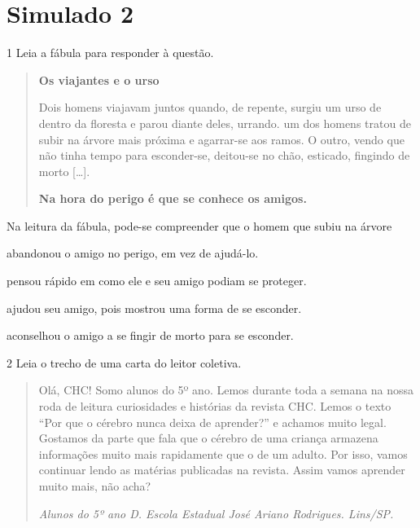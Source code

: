 \chapter{Simulado 2}

\num{1} Leia a fábula para responder à questão.

\begin{quote}
\textbf{Os viajantes e o urso}

Dois homens viajavam juntos quando, de repente, surgiu um urso de dentro
da floresta e parou diante deles, urrando. um dos homens tratou de subir
na árvore mais próxima e agarrar-se aos ramos. O outro, vendo que não
tinha tempo para esconder-se, deitou-se no chão, esticado, fingindo de
morto {[}\ldots{}{]}.

\textbf{Na hora do perigo é que se conhece os amigos.}
\end{quote}


Na leitura da fábula, pode-se compreender que o homem que subiu na árvore

\begin{escolha}
\item abandonou o amigo no perigo, em vez de ajudá-lo.

\item pensou rápido em como ele e seu amigo podiam se proteger.

\item ajudou seu amigo, pois mostrou uma forma de se esconder.

\item aconselhou o amigo a se fingir de morto para se esconder.
\end{escolha}



\num{2} Leia o trecho de uma carta do leitor coletiva.

\begin{quote}
Olá, CHC! Somo alunos do 5º ano. Lemos durante toda a semana na nossa
roda de leitura curiosidades e histórias da revista CHC. Lemos o texto
``Por que o cérebro nunca deixa de aprender?'' e achamos muito legal.
Gostamos da parte que fala que o cérebro de uma criança armazena
informações muito mais rapidamente que o de um adulto. Por isso, vamos
continuar lendo as matérias publicadas na revista. Assim vamos aprender
muito mais, não acha?

\begin{flushleft}
\textit{Alunos do 5º ano D. Escola Estadual José Ariano Rodrigues. Lins/SP.}
\end{flushleft}
\end{quote}

